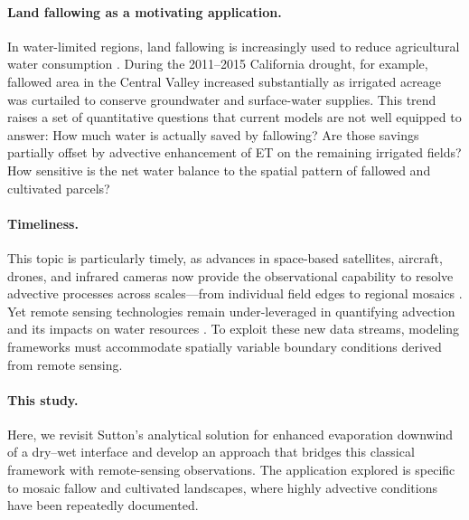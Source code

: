 \documentclass{article}
\begin{document}

\paragraph{Land fallowing as a motivating application.}
In water-limited regions, land fallowing is increasingly used to reduce agricultural water consumption \cite{melton2014mapping}.
During the 2011--2015 California drought, for example, fallowed area in the Central Valley increased substantially as irrigated acreage was curtailed to conserve groundwater and surface-water supplies.
This trend raises a set of quantitative questions that current models are not well equipped to answer: How much water is actually saved by fallowing?  Are those savings partially offset by advective enhancement of ET on the remaining irrigated fields?  How sensitive is the net water balance to the spatial pattern of fallowed and cultivated parcels?


\paragraph{Timeliness.}
This topic is particularly timely, as advances in space-based satellites, aircraft, drones, and infrared cameras now provide the observational capability to resolve advective processes across scales---from individual field edges to regional mosaics \cite{volk2024assessing, fisher2020ecostress, derardja2024advancements}.
Yet remote sensing technologies remain under-leveraged in quantifying advection and its impacts on water resources \cite{liu2016regional}.
To exploit these new data streams, modeling frameworks must accommodate spatially variable boundary conditions derived from remote sensing.


\paragraph{This study.}
Here, we revisit Sutton's analytical solution for enhanced evaporation downwind of a dry--wet interface \cite{sutton1934wind} and develop an approach that bridges this classical framework with remote-sensing observations.
The application explored is specific to mosaic fallow and cultivated landscapes, where highly advective conditions have been repeatedly documented.
\end{document}

